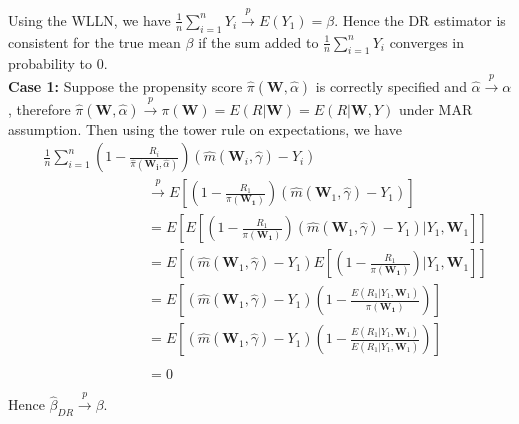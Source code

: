 \documentclass[12pt,twoside]{article}
\begin{document}
Using the WLLN, we have $\frac{1}{n}\sum_{i=1}^{n} Y_i\xrightarrow{p} E(Y_1) = \beta$. Hence the DR estimator is consistent for the true mean $\beta$ if the sum added to $\frac{1}{n}\sum_{i=1}^{n} Y_i$ converges in probability to 0. \\

\textbf{Case 1:} Suppose the propensity score $\hat\pi(\mathbf{W},\hat{\alpha})$ is correctly specified and $\hat{\alpha} \xrightarrow{p} \alpha$, therefore  $\hat\pi(\mathbf{W},\hat{\alpha}) \xrightarrow{p} \pi(\mathbf{W}) = E(R|\mathbf{W}) = E(R|\mathbf{W}, Y)$ under MAR assumption. Then using the tower rule on expectations, we have
\begin{align*}
& \frac{1}{n}\sum_{i=1}^{n}\left(1 - \frac{R_i}{\hat\pi(\mathbf{W_i},\hat{\alpha})} \right) (\hat m(\mathbf{W}_i, \hat\gamma)-Y_i) \\
     & \phantom{E [(1 - \frac{R_1}{\pi(\mathbf{W_1})})} \xrightarrow{p} E \left[\left(1 - \frac{R_1}{\pi(\mathbf{W_1})} \right) (\hat m(\mathbf{W}_1, \hat\gamma)-Y_1)\right]  \\
     & \phantom{E [(1 - \frac{R_1}{\pi(\mathbf{W_1})})} = E\left[E\left[\left(1 - \frac{R_1}{\pi(\mathbf{W_1})} \right) (\hat m(\mathbf{W}_1, \hat\gamma)-Y_1)|Y_1, \mathbf{W}_1\right]\right] \\
     & \phantom{E [(1 - \frac{R_1}{\pi(\mathbf{W_1})})} = E\left[ (\hat m(\mathbf{W}_1, \hat\gamma)-Y_1)E\left[\left(1 - \frac{R_1}{\pi(\mathbf{W_1})} \right)|Y_1, \mathbf{W}_1\right]\right] \\
     & \phantom{E [(1 - \frac{R_1}{\pi(\mathbf{W_1})})} = E\left[ (\hat m(\mathbf{W}_1, \hat\gamma)-Y_1)\left(1 - \frac{E(R_1|Y_1, \mathbf{W}_1)}{\pi(\mathbf{W_1})} \right)\right] \\
     & \phantom{E [(1 - \frac{R_1}{\pi(\mathbf{W_1})})} = E\left[ (\hat m(\mathbf{W}_1, \hat\gamma)-Y_1)\left(1 - \frac{E(R_1|Y_1, \mathbf{W}_1)}{E(R_1|Y_1, \mathbf{W}_1)} \right)\right] \\
     &  \phantom{E [(1 - \frac{R_1}{\pi(\mathbf{W_1})})} = 0
\end{align*}
Hence $\hat{\beta}_{DR} \xrightarrow{p} \beta$. \\
\end{document}
